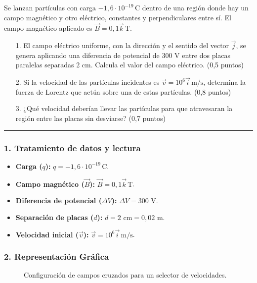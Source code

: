 \begin{cajaenunciado}
Se lanzan partículas con carga $-1,6\cdot10^{-19}\,\text{C}$ dentro de una región donde hay un campo magnético y otro eléctrico, constantes y perpendiculares entre sí. El campo magnético aplicado es $\vec{B}=0,1\vec{k}\,\text{T}$.
\begin{enumerate}
    \item[1.] El campo eléctrico uniforme, con la dirección y el sentido del vector $\vec{j}$, se genera aplicando una diferencia de potencial de 300 V entre dos placas paralelas separadas 2 cm. Calcula el valor del campo eléctrico. (0,5 puntos)
    \item[2.] Si la velocidad de las partículas incidentes es $\vec{v}=10^6\vec{i}\,\text{m/s}$, determina la fuerza de Lorentz que actúa sobre una de estas partículas. (0,8 puntos)
    \item[3.] ¿Qué velocidad deberían llevar las partículas para que atravesaran la región entre las placas sin desviarse? (0,7 puntos)
\end{enumerate}
\end{cajaenunciado}
\hrule

\subsubsection*{1. Tratamiento de datos y lectura}
\begin{itemize}
    \item \textbf{Carga ($q$):} $q = -1,6\cdot10^{-19}\,\text{C}$.
    \item \textbf{Campo magnético ($\vec{B}$):} $\vec{B} = 0,1\vec{k}\,\text{T}$.
    \item \textbf{Diferencia de potencial ($\Delta V$):} $\Delta V = 300$ V.
    \item \textbf{Separación de placas ($d$):} $d = 2 \text{ cm} = 0,02$ m.
    \item \textbf{Velocidad inicial ($\vec{v}$):} $\vec{v}=10^6\vec{i}\,\text{m/s}$.
\end{itemize}

\subsubsection*{2. Representación Gráfica}
\begin{figure}[H]
    \centering
    \caption{Configuración de campos cruzados para un selector de velocidades.}
\end{figure}

